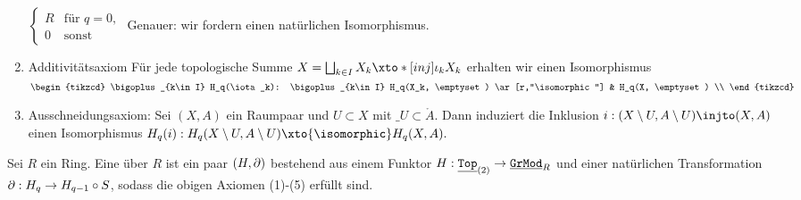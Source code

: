 \begin{enumerate}[(1)]
\begin{math}
\begin{cases}
                R & \text{für $q = 0$}, \\
                0 & \text{sonst}
            \end{cases}
        \end{math}
        Genauer: wir fordern einen natürlichen Isomorphismus.
    \item
        Additivitätsaxiom
        Für jede topologische Summe $X = \bigsqcup_{k \in I} X_k \xto*[inj]{\iota_k} X_k$ erhalten wir einen Isomorphismus
        \begin{math}
            \begin{tikzcd}
                \bigoplus_{k\in I} H_q(\iota_k): \bigoplus_{k\in I} H_q(X_k, \emptyset) \ar[r,"\isomorphic"] & H_q(X, \emptyset) \\
            \end{tikzcd}
        \end{math}
    \item
        Ausschneidungsaxiom:
        Sei $(X, A)$ ein Raumpaar und $U \subset X$ mit $\_U \subset \mathring A$.
        Dann induziert die Inklusion $i: (X \setminus U, A \setminus U) \injto (X, A)$ einen Isomorphismus
        \begin{math}
            H_q(i): H_q(X \setminus U, A \setminus U) \xto{\isomorphic} H_q(X, A).
        \end{math}
\end{enumerate}

\begin{df}
    Sei $R$ ein Ring.
    Eine  über $R$ ist ein paar $(H, \mathord{\partial})$ bestehend aus einem Funktor $H: \underline{\mathtt{Top}}_{(2)} \to \underline{\mathtt{GrMod}}_{R}$ und einer natürlichen Transformation $\mathord{\partial}: H_q \to H_{q-1} \circ S$, sodass die obigen Axiomen (1)-(5) erfüllt sind.
\end{df}

